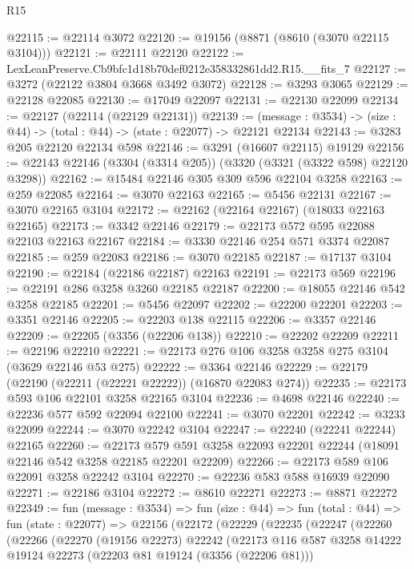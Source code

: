 \begin{lexlean}{R15}
\begin{coremodule}
@22115 := @22114 @3072
@22120 := @19156 (@8871 (@8610 (@3070 @22115 @3104)))
@22121 := @22111 @22120
@22122 := LexLeanPreserve.Cb9bfc1d18b70def0212e358332861dd2.R15.__fits_7
@22127 := @3272 (@22122 @3804 @3668 @3492 @3072)
@22128 := @3293 @3065
@22129 := @22128 @22085
@22130 := @17049 @22097
@22131 := @22130 @22099
@22134 := @22127 (@22114 (@22129 @22131))
@22139 := (message : @3534) -> (size : @44) -> (total : @44) -> (state : @22077) -> @22121 @22134
@22143 := @3283 @205 @22120 @22134 @598
@22146 := @3291 (@16607 @22115) @19129
@22156 := @22143 @22146 (@3304 (@3314 @205)) (@3320 (@3321 (@3322 @598) @22120 @3298))
@22162 := @15484 @22146 @305 @309 @596 @22104 @3258
@22163 := @259 @22085
@22164 := @3070 @22163
@22165 := @5456 @22131
@22167 := @3070 @22165 @3104
@22172 := @22162 (@22164 @22167) (@18033 @22163 @22165)
@22173 := @3342 @22146
@22179 := @22173 @572 @595 @22088 @22103 @22163 @22167
@22184 := @3330 @22146 @254 @571 @3374 @22087
@22185 := @259 @22083
@22186 := @3070 @22185
@22187 := @17137 @3104
@22190 := @22184 (@22186 @22187) @22163
@22191 := @22173 @569
@22196 := @22191 @286 @3258 @3260 @22185 @22187
@22200 := @18055 @22146 @542 @3258 @22185
@22201 := @5456 @22097
@22202 := @22200 @22201
@22203 := @3351 @22146
@22205 := @22203 @138 @22115
@22206 := @3357 @22146
@22209 := @22205 (@3356 (@22206 @138))
@22210 := @22202 @22209
@22211 := @22196 @22210
@22221 := @22173 @276 @106 @3258 @3258 @275 @3104 (@3629 @22146 @53 @275)
@22222 := @3364 @22146
@22229 := @22179 (@22190 (@22211 (@22221 @22222)) (@16870 @22083 @274))
@22235 := @22173 @593 @106 @22101 @3258 @22165 @3104
@22236 := @4698 @22146
@22240 := @22236 @577 @592 @22094 @22100
@22241 := @3070 @22201
@22242 := @3233 @22099
@22244 := @3070 @22242 @3104
@22247 := @22240 (@22241 @22244) @22165
@22260 := @22173
    @579
    @591
    @3258
    @22093
    @22201
    @22244
    (@18091 @22146 @542 @3258 @22185 @22201 @22209)
@22266 := @22173 @589 @106 @22091 @3258 @22242 @3104
@22270 := @22236 @583 @588 @16939 @22090
@22271 := @22186 @3104
@22272 := @8610 @22271
@22273 := @8871 @22272
@22349 := fun (message : @3534) =>
  fun (size : @44) =>
  fun (total : @44) =>
  fun (state : @22077) =>
  @22156
    (@22172
      (@22229
        (@22235
          (@22247
            (@22260
              (@22266
                (@22270
                  (@19156 @22273)
                  @22242
                  (@22173
                    @116
                    @587
                    @3258
                    @14222
                    @19124
                    @22273
                    (@22203 @81 @19124 (@3356 (@22206 @81)))

\end{coremodule}
\end{lexlean}

